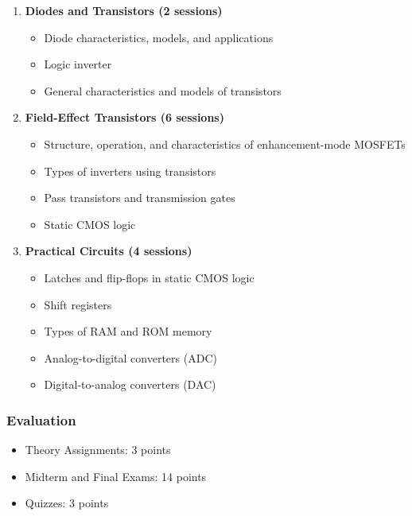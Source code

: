 \documentclass[12pt]{article}
\begin{document}
\begin{enumerate}
\begin{itemize}
    \end{itemize}
    \item \textbf{Diodes and Transistors (2 sessions)}
    \begin{itemize}
        \item Diode characteristics, models, and applications
        \item Logic inverter
        \item General characteristics and models of transistors
    \end{itemize}
    \item \textbf{Field-Effect Transistors (6 sessions)}
    \begin{itemize}
        \item Structure, operation, and characteristics of enhancement-mode MOSFETs
        \item Types of inverters using transistors
        \item Pass transistors and transmission gates
        \item Static CMOS logic
    \end{itemize}
    \item \textbf{Practical Circuits (4 sessions)}
    \begin{itemize}
        \item Latches and flip-flops in static CMOS logic
        \item Shift registers
        \item Types of RAM and ROM memory
        \item Analog-to-digital converters (ADC)
        \item Digital-to-analog converters (DAC)
    \end{itemize}
\end{enumerate}

\subsubsection*{Evaluation}
\begin{itemize}
    \item Theory Assignments: 3 points
    \item Midterm and Final Exams: 14 points
    \item Quizzes: 3 points
\end{itemize}
\end{document}
